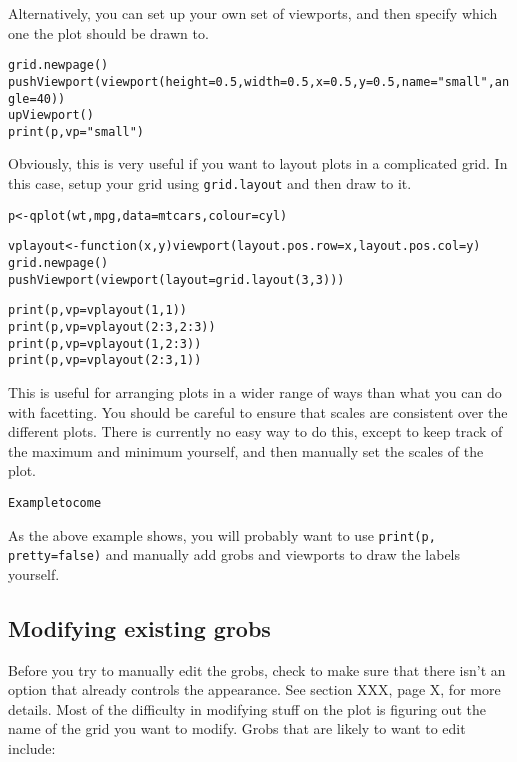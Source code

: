 Alternatively, you can set up your own set of viewports, and then specify which one the plot should be drawn to.

\begin{alltt}
grid.newpage()
pushViewport(viewport(height=0.5, width=0.5, x=0.5, y=0.5, name="small", angle=40))
upViewport()
print(p, vp="small")
\end{alltt}

Obviously, this is very useful if you want to layout plots in a complicated grid.  In this case, setup your grid using {\tt grid.layout} and then draw to it.

\begin{alltt}
p <- qplot(wt, mpg, data=mtcars, colour=cyl)

vplayout <- function(x, y) viewport(layout.pos.row=x, layout.pos.col=y)
grid.newpage()
pushViewport(viewport(layout=grid.layout(3,3)))

print(p, vp=vplayout(1,1))
print(p, vp=vplayout(2:3,2:3))
print(p, vp=vplayout(1, 2:3))
print(p, vp=vplayout(2:3, 1))
\end{alltt}

This is useful for arranging plots in a wider range of ways than what you can do with facetting.   You should be careful to ensure that scales are consistent over the different plots.  There is currently no easy way to do this, except to keep track of the maximum and minimum yourself, and then manually set the scales of the plot.

\begin{alltt}
Example to come
\end{alltt}

As the above example shows, you will probably want to use {\tt print(p, pretty=false)} and manually add grobs and viewports to draw the labels yourself.
 
\subsection{Modifying existing grobs}\label{sec:modifying_stuff}

Before you try to manually edit the grobs, check to make sure that there isn't an option that already controls the appearance.  See section XXX, page X, for more details.  Most of the difficulty in modifying stuff on the plot is figuring out the name of the grid you want to modify.  Grobs that are likely to want to edit include:

